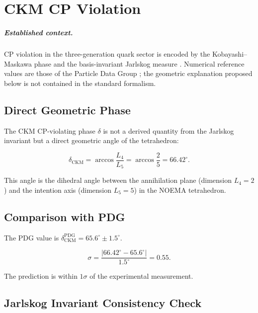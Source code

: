 \chapter{CKM CP Violation}
\label{ch:ckm_cp_violation}


\paragraph{Established context.}
CP violation in the three-generation quark sector is encoded by the
Kobayashi--Maskawa phase and the basis-invariant Jarlskog measure
\cite{kobayashi1973,Jarlskog1985,Wolfenstein1983}.  Numerical reference values are
those of the Particle Data Group \cite{PDG2024}; the geometric explanation
proposed below is not contained in the standard formalism.

\section{Direct Geometric Phase}

The CKM CP-violating phase \(\delta\) is not a derived quantity from the
Jarlskog invariant but a direct geometric angle of the tetrahedron:

\begin{equation}
\delta_{\text{CKM}} = \arccos\frac{L_4}{L_5}
                    = \arccos\frac{2}{5}
                    = 66.42^\circ.
\label{eq:ckm_delta}
\end{equation}

This angle is the dihedral angle between the annihilation plane
(dimension \(L_4 = 2\)) and the intention axis (dimension \(L_5 = 5\))
in the NOEMA tetrahedron.

\section{Comparison with PDG}

The PDG value is \(\delta_{\text{CKM}}^{\text{PDG}} = 65.6^\circ \pm 1.5^\circ\).

\[
\sigma = \frac{|66.42^\circ - 65.6^\circ|}{1.5^\circ} = 0.55.
\]

The prediction is within \(1\sigma\) of the experimental measurement.

\section{Jarlskog Invariant Consistency Check}

